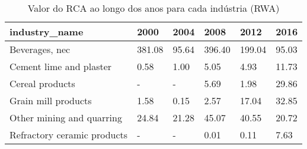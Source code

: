 \begin{table}
\centering
\caption{Valor do RCA ao longo dos anos para cada indústria (RWA)}
\begin{tabular}{p{6cm}p{1.5cm}p{1.5cm}p{1.5cm}p{1.5cm}p{1.5cm}}
\toprule
              industry\_name &   2000 &  2004 &   2008 &   2012 &  2016 \\
\midrule
             Beverages, nec & 381.08 & 95.64 & 396.40 & 199.04 & 95.03 \\
    Cement lime and plaster &   0.58 &  1.00 &   5.05 &   4.93 & 11.73 \\
            Cereal products &      - &     - &   5.69 &   1.98 & 29.86 \\
        Grain mill products &   1.58 &  0.15 &   2.57 &  17.04 & 32.85 \\
  Other mining and quarring &  24.84 & 21.28 &  45.07 &  40.55 & 20.72 \\
Refractory ceramic products &      - &     - &   0.01 &   0.11 &  7.63 \\
\bottomrule
\end{tabular}
\end{table}
